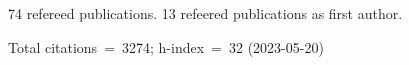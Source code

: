 74 refereed publications. 13 refeered publications as first author.

Total citations~=~3274; h-index~=~32 (2023-05-20)